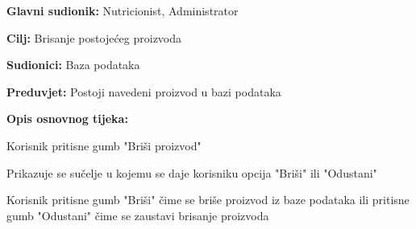                     \noindent {}
                    \begin{packed_item}
    
                        \item \textbf{Glavni sudionik: }Nutricionist, Administrator
                        \item  \textbf{Cilj:} Brisanje postojećeg proizvoda
                        \item  \textbf{Sudionici:} Baza podataka
                        \item  \textbf{Preduvjet:} Postoji navedeni proizvod u bazi podataka
                        \item  \textbf{Opis osnovnog tijeka:} 
                        
                        \item[] \begin{packed_enum}
    
                            \item Korisnik pritisne gumb "Briši proizvod"
                            \item Prikazuje se sučelje u kojemu se daje korisniku opcija "Briši" ili "Odustani"
                            \item Korisnik pritisne gumb "Briši" čime se briše proizvod iz baze podataka ili pritisne gumb "Odustani" čime se zaustavi brisanje proizvoda
                        \end{packed_enum}
                        
                    \end{packed_item}

